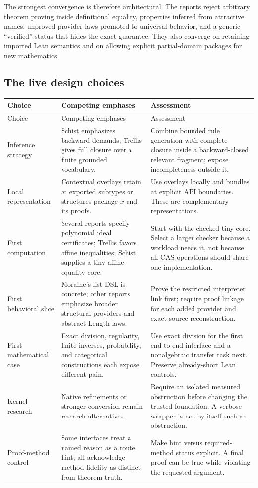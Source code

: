 \documentclass[11pt,letterpaper]{article}
\theoremstyle{definition}\newtheorem{definition}[proposition]{Definition}
\theoremstyle{remark}\newtheorem{remark}[proposition]{Remark}
\begin{document}
The strongest convergence is therefore architectural. The reports reject
arbitrary theorem proving inside definitional equality, properties inferred
from attractive names, unproved provider laws promoted to universal behavior,
and a generic ``verified'' status that hides the exact guarantee. They also
converge on retaining imported Lean semantics and on allowing explicit
partial-domain packages for new mathematics.

\subsection{The live design choices}
\begin{center}\small
\begin{longtable}{@{}P{0.20\textwidth}P{0.36\textwidth}P{0.36\textwidth}@{}}
\toprule Choice & Competing emphases & Assessment\\\midrule\endfirsthead
\toprule Choice & Competing emphases & Assessment\\\midrule\endhead
\bottomrule\endfoot
Inference strategy & Schist emphasizes backward demands; Trellis gives full closure over a finite grounded vocabulary. & Combine bounded rule generation with complete closure inside a backward-closed relevant fragment; expose incompleteness outside it.\\
Local representation & Contextual overlays retain $x$; exported subtypes or structures package $x$ and its proofs. & Use overlays locally and bundles at explicit API boundaries. These are complementary representations.\\
First computation & Several reports specify polynomial ideal certificates; Trellis favors affine inequalities; Schist supplies a tiny affine equality core. & Start with the checked tiny core. Select a larger checker because a workload needs it, not because all CAS operations should share one implementation.\\
First behavioral slice & Moraine's list DSL is concrete; other reports emphasize broader structural providers and abstract Length laws. & Prove the restricted interpreter link first; require proof linkage for each added provider and exact source reconstruction.\\
First mathematical case & Exact division, regularity, finite inverses, probability, and categorical constructions each expose different pain. & Use exact division for the first end-to-end interface and a nonalgebraic transfer task next. Preserve already-short Lean controls.\\
Kernel research & Native refinements or stronger conversion remain research alternatives. & Require an isolated measured obstruction before changing the trusted foundation. A verbose wrapper is not by itself such an obstruction.\\
Proof-method control & Some interfaces treat a named reason as a route hint; all acknowledge method fidelity as distinct from theorem truth. & Make hint versus required-method status explicit. A final proof can be true while violating the requested argument.\\
\end{longtable}
\end{center}
\end{document}
